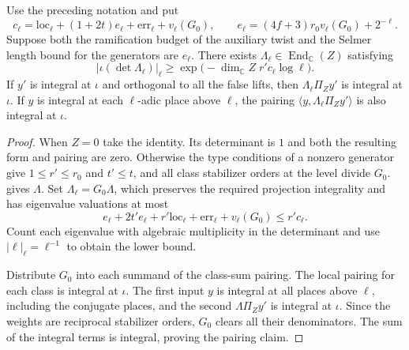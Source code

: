\begin{lemma}
\label{lem:c-clearing-determinant}
\emitthmsource
Use the preceding notation and put
\begin{equation}
 c_\ell=\mathrm{loc}_\ell+(1+2t)e_\ell+\mathrm{err}_\ell+v_\ell(G_0),
 \qquad e_\ell=(4f+3)r_0v_\ell(G_0)+2^{-\ell}.
\label{eq:c-clearing-determinant}
\end{equation}
Suppose both the ramification budget of the auxiliary twist and the Selmer length bound for the generators are $e_\ell$.
There exists $\Lambda_\ell\in\operatorname{End}_{\mathbb C}(Z)$ satisfying
\[
 |\iota(\det\Lambda_\ell)|_\ell
 \ge\exp\bigl(-\dim_{\mathbb C}Z\;r'c_\ell\log\ell\bigr).
\]
If $y'$ is integral at $\iota$ and orthogonal to all the false lifts, then $\Lambda_\ell\Pi_Zy'$ is integral at $\iota$.
If $y$ is integral at each $\ell$-adic place above $\ell$, the pairing $\langle y,\Lambda_\ell\Pi_Zy'\rangle$ is also integral at $\iota$.
\end{lemma}
\begin{proof}
When $Z=0$ take the identity. Its determinant is $1$ and both the resulting form and pairing are zero.
Otherwise the type conditions of a nonzero generator give $1\le r'\le r_0$ and $t'\le t$, and all class stabilizer orders at the level divide $G_0$.
 gives $\Lambda$. Set $\Lambda_\ell=G_0\Lambda$, which preserves the required projection integrality and has eigenvalue valuations at most
\[
 e_\ell+2t'e_\ell+r'\mathrm{loc}_\ell+\mathrm{err}_\ell+v_\ell(G_0)
 \le r'c_\ell .
\]
Count each eigenvalue with algebraic multiplicity in the determinant and use $|\ell|_\ell=\ell^{-1}$ to obtain the lower bound.

Distribute $G_0$ into each summand of the class-sum pairing.
The local pairing for each class is integral at $\iota$. The first input $y$ is integral at all places above $\ell$, including the conjugate places, and the second $\Lambda\Pi_Zy'$ is integral at $\iota$.
Since the weights are reciprocal stabilizer orders, $G_0$ clears all their denominators.
The sum of the integral terms is integral, proving the pairing claim.
\end{proof}


